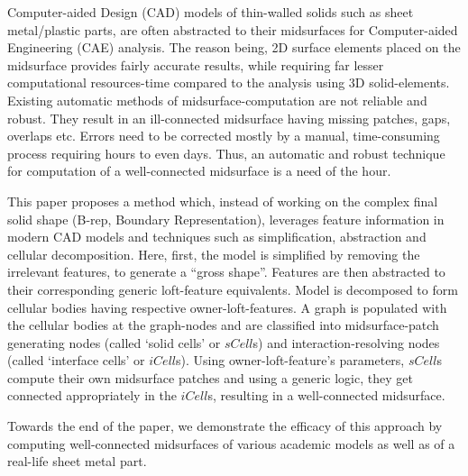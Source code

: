 Computer-aided Design (CAD) models of thin-walled solids such as sheet metal/plastic parts, are often abstracted to their midsurfaces for Computer-aided Engineering (CAE) analysis. The reason being, 2D surface elements placed on the midsurface provides fairly accurate results, while requiring far lesser computational resources-time compared to the analysis using 3D solid-elements. Existing automatic methods of midsurface-computation are not reliable and robust. They result in an ill-connected midsurface having missing patches, gaps, overlaps etc.  Errors need to be corrected mostly by a manual, time-consuming process requiring hours to even days. Thus, an automatic and robust technique for computation of a well-connected midsurface is a need of the hour. %

This paper proposes a method which, instead of working on the complex final solid shape (B-rep, Boundary Representation), leverages feature information in modern CAD models and techniques such as simplification, abstraction and cellular decomposition. Here, first, the model is simplified by removing the irrelevant features, to generate a ``gross shape''.  Features are then abstracted to their corresponding generic loft-feature equivalents. Model is decomposed to form cellular bodies having respective owner-loft-features. A graph is populated with the cellular bodies at the graph-nodes and are  classified into midsurface-patch generating nodes (called `solid cells' or $sCell$s) and interaction-resolving nodes (called `interface cells' or $iCell$s). Using owner-loft-feature's parameters, $sCell$s compute their own midsurface patches and using a generic logic, they get connected appropriately in the $iCell$s, resulting in a well-connected midsurface.

Towards the end of the paper, we demonstrate the efficacy of this approach by computing well-connected midsurfaces of various academic models as well as of a real-life sheet metal part.